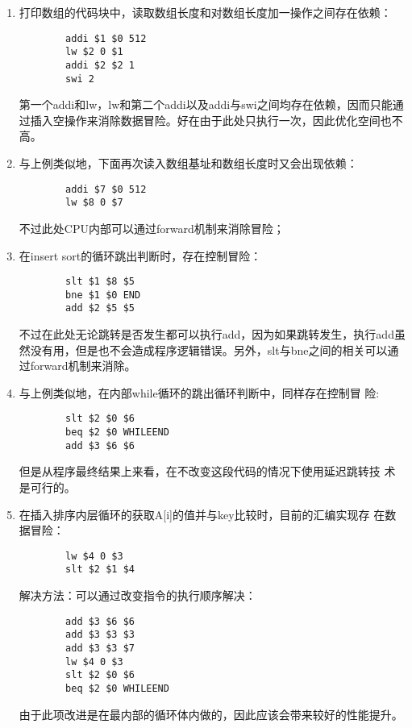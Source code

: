 \documentclass[a4paper,dvipdfm]{ctexart}
\begin{document}
\begin{enumerate}
\item 打印数组的代码块中，读取数组长度和对数组长度加一操作之间存在依赖：
\begin{lstlisting}
        addi $1 $0 512
        lw $2 0 $1
        addi $2 $2 1
        swi 2
\end{lstlisting}
  第一个addi和lw，lw和第二个addi以及addi与swi之间均存在依赖，因而只能通
  过插入空操作来消除数据冒险。好在由于此处只执行一次，因此优化空间也不
  高。
\item 与上例类似地，下面再次读入数组基址和数组长度时又会出现依赖：
\begin{lstlisting}
        addi $7 $0 512
        lw $8 0 $7
\end{lstlisting}
  不过此处CPU内部可以通过forward机制来消除冒险；
\item 在insert sort的循环跳出判断时，存在控制冒险：
\begin{lstlisting}
        slt $1 $8 $5
        bne $1 $0 END
        add $2 $5 $5
\end{lstlisting}
  不过在此处无论跳转是否发生都可以执行add，因为如果跳转发生，执行add虽
  然没有用，但是也不会造成程序逻辑错误。另外，slt与bne之间的相关可以通
  过forward机制来消除。
\item 与上例类似地，在内部while循环的跳出循环判断中，同样存在控制冒
  险:
\begin{lstlisting}
        slt $2 $0 $6
        beq $2 $0 WHILEEND
        add $3 $6 $6
\end{lstlisting}
  但是从程序最终结果上来看，在不改变这段代码的情况下使用延迟跳转技
  术是可行的。
\item 在插入排序内层循环的获取A[i]的值并与key比较时，目前的汇编实现存
  在数据冒险：
\begin{lstlisting}
        lw $4 0 $3
        slt $2 $1 $4
\end{lstlisting}
解决方法：可以通过改变指令的执行顺序解决：
\begin{lstlisting}
        add $3 $6 $6
        add $3 $3 $3
        add $3 $3 $7
        lw $4 0 $3
        slt $2 $0 $6
        beq $2 $0 WHILEEND
\end{lstlisting}
由于此项改进是在最内部的循环体内做的，因此应该会带来较好的性能提升。
\end{enumerate}


\appendix{}



\end{document}
